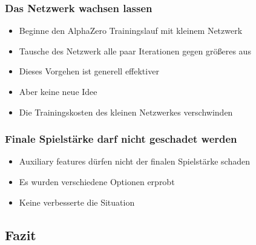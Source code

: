 \begin{frame}
 \frametitle{Das Netzwerk wachsen lassen}
  


\begin{itemize}
  \item \pause Beginne den AlphaZero Trainingslauf mit kleinem Netzwerk
  \item \pause Tausche des Netzwerk alle paar Iterationen gegen größeres aus
  \item \pause Dieses Vorgehen ist generell effektiver
  \item \pause Aber keine neue Idee
  \item \pause Die Trainingskosten des kleinen Netzwerkes verschwinden
\end{itemize}

  
\end{frame}
\begin{frame}
 \frametitle{Finale Spielstärke darf nicht geschadet werden}
  


\begin{itemize}
  \item \pause Auxiliary features dürfen nicht der finalen Spielstärke schaden
  \item \pause Es wurden verschiedene Optionen erprobt
  \item \pause Keine verbesserte die Situation
\end{itemize}

  
\end{frame}

\subsection{Fazit}



